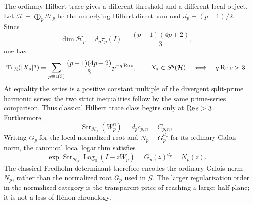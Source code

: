 The ordinary Hilbert trace gives a different threshold and a different local
object.  Let \(\mathcal H=\bigoplus_p\mathcal H_p\) be the underlying Hilbert
direct sum and \(d_p=(p-1)/2\).  Since
\[
 \dim\mathcal H_p
 =d_p\tau_p(I)=\frac{(p-1)(4p+2)}3,
\]
one has
\[
 \operatorname{Tr}_{\mathcal H}(|X_s|^q)
 =\sum_{p\equiv1(3)}\frac{(p-1)(4p+2)}3p^{-q\operatorname{Re} s},
 \qquad
 X_s\in S^q(\mathcal H)
 \quad\Longleftrightarrow\quad q\operatorname{Re} s>3.
\]
At equality the series is a positive constant multiple of the divergent
split-prime harmonic series; the two strict inequalities follow by the same
prime-series comparison.  Thus classical Hilbert trace class begins only at
\(\operatorname{Re} s>3\).  Furthermore,
\[
 \operatorname{Str}_{\mathcal H_p}(W_p^n)
 =d_pc_{p,n}=C_{p,n},
\]
Writing \(G_p\) for the local normalized root and
\(N_p=G_p^{d_p}\) for its ordinary Galois norm, the canonical local
logarithm satisfies
\[
 \exp\operatorname{Str}_{\mathcal H_p}\operatorname{Log}_0(I-zW_p)
 =G_p(z)^{d_p}=N_p(z).
\]
The classical Fredholm determinant therefore encodes the ordinary Galois
norm \(N_p\), rather than the normalized root \(G_p\) used in
\(\mathcal G\).  The larger regularization order in the normalized category
is the transparent price of reaching a larger half-plane; it is not a loss
of H\'enon chronology.

